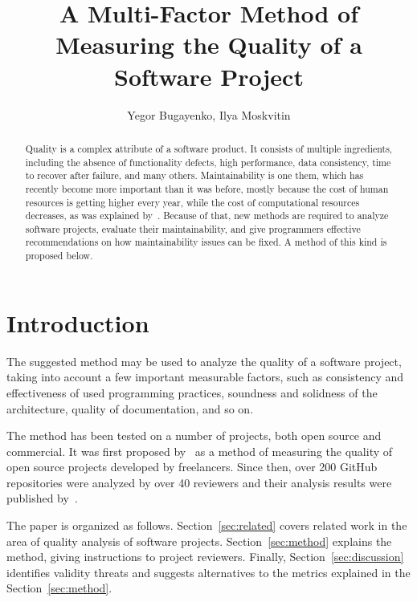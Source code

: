 \documentclass[12pt,oneside]{article}
\title{A Multi-Factor Method of Measuring the Quality of a Software Project}
\author{Yegor Bugayenko, Ilya Moskvitin}
\begin{document}
\raggedbottom
\setlength{\topskip}{6pt}
\setlength{\parindent}{0pt} %
\setlength{\parskip}{6pt} %

\maketitle

\begin{abstract}
Quality is a complex attribute of a software product. It consists of
multiple ingredients, including the absence of functionality defects,
high performance, data consistency, time to recover after failure, and
many others. Maintainability is one them, which has recently become
more important than it was before, mostly because the cost of
human resources is getting higher every year, while the cost of
computational resources decreases, as was explained by~\citet{yb-hacking}.
Because of that, new methods are required to analyze software projects, evaluate their
maintainability, and give programmers effective recommendations on
how maintainability issues can be fixed. A method of this kind is proposed
below.
\end{abstract}

\section{Introduction}

The suggested method may be used to analyze the quality
of a software project, taking into account a few important
measurable factors, such as consistency and effectiveness of
used programming practices, soundness and solidness of the
architecture, quality of documentation, and so on.

The method has been tested on a number of projects, both
open source and commercial. It was first proposed by~\citet{yb-sins}
as a method of measuring the quality of open source projects developed
by freelancers. Since then, over 200 GitHub repositories were
analyzed by over 40 reviewers and their analysis results were published
by~\citet{yb-award}.

The paper is organized as follows.
Section~\ref{sec:related} covers related work in the area of quality analysis
of software projects.
Section~\ref{sec:method} explains the method, giving instructions
to project reviewers.
Finally, Section~\ref{sec:discussion} identifies validity threats and suggests
alternatives to the metrics explained in the Section~\ref{sec:method}.
\end{document}
